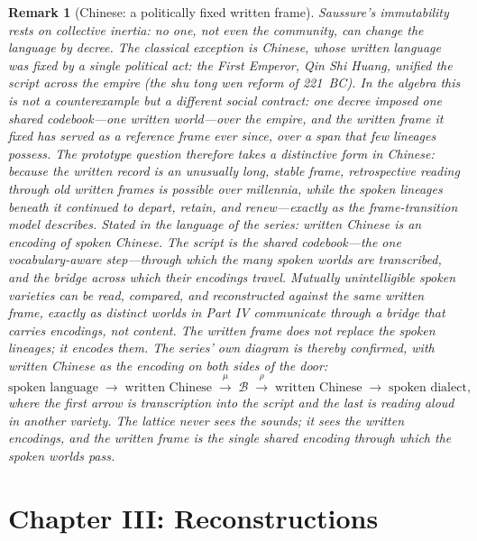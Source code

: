 \documentclass[11pt,a4paper]{article}
\newtheorem{remark}[principle]{Remark}
\theoremstyle{remark}
\newcommand{\Lat}{\ensuremath{\mathcal{B}}}              %
\newcommand{\Ing}{\ensuremath{\mu}}                      %
\newcommand{\Mat}{\ensuremath{\rho}}                     %
\begin{document}
\begin{remark}[Chinese: a politically fixed written frame]
\label{rem:chinese}
Saussure's immutability rests on collective inertia: no one, not even the
community, can change the language by decree. The classical exception is
Chinese, whose \emph{written} language was fixed by a single political act:
the First Emperor, Qin Shi Huang, unified the script across the empire (the
\emph{shu tong wen} reform of 221~BC). In the algebra this is not a
counterexample but a different social contract: one decree imposed one shared
codebook---one written world---over the empire, and the written frame it
fixed has served as a reference frame ever since, over a span that few
lineages possess. The prototype question therefore takes a distinctive form
in Chinese: because the written record is an unusually long, stable frame,
retrospective reading through old written frames is possible over millennia,
while the spoken lineages beneath it continued to depart, retain, and
renew---exactly as the frame-transition model describes. Stated in the
language of the series: written Chinese is an \emph{encoding} of spoken
Chinese. The script is the shared codebook---the one vocabulary-aware
step---through which the many spoken worlds are transcribed, and the bridge
across which their encodings travel. Mutually unintelligible spoken
varieties can be read, compared, and reconstructed against the same written
frame, exactly as distinct worlds in Part IV communicate through a bridge
that carries encodings, not content. The written frame does not replace the
spoken lineages; it encodes them. The series' own diagram is thereby
confirmed, with written Chinese as the encoding on both sides of the door:
\[
  \text{spoken language}
  \;\to\;
  \text{written Chinese}
  \;\xrightarrow{\;\Ing\;}\;
  \Lat
  \;\xrightarrow{\;\Mat\;}\;
  \text{written Chinese}
  \;\to\;
  \text{spoken dialect},
\]
where the first arrow is transcription into the script and the last is
reading aloud in another variety. The lattice never sees the sounds; it sees
the written encodings, and the written frame is the single shared encoding
through which the spoken worlds pass.
\end{remark}

\section{Chapter III: Reconstructions}
\label{sec:ch3}
\end{document}
